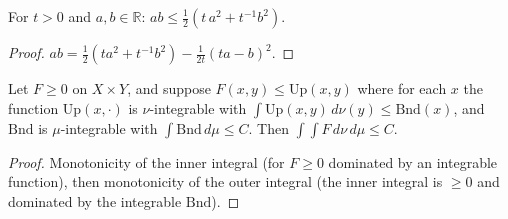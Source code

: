 \begin{lemma}
\label{lem:sg-tal:amgm-weighted}
  \leanok
{}
For $t>0$ and $a,b\in\mathbb R$: $ab\le\frac12(t\,a^2+t^{-1}b^2)$.
\end{lemma}
\begin{proof}
  \leanok
$ab=\frac12(ta^2+t^{-1}b^2)-\frac1{2t}(ta-b)^2$.
\end{proof}

\begin{lemma}
\label{lem:sg-tal:double-dominated}
  \leanok
{}
Let $F\ge0$ on $X\times Y$, and suppose $F(x,y)\le\mathrm{Up}(x,y)$ where for each $x$ the function $\mathrm{Up}(x,\cdot)$ is $\nu$-integrable with $\int\mathrm{Up}(x,y)\,d\nu(y)\le\mathrm{Bnd}(x)$, and $\mathrm{Bnd}$ is $\mu$-integrable with $\int\mathrm{Bnd}\,d\mu\le C$.  Then $\int\!\!\int F\,d\nu\,d\mu\le C$.
\end{lemma}
\begin{proof}
  \leanok
Monotonicity of the inner integral (for $F\ge0$ dominated by an integrable function), then monotonicity of the outer integral (the inner integral is $\ge0$ and dominated by the integrable $\mathrm{Bnd}$).
\end{proof}

